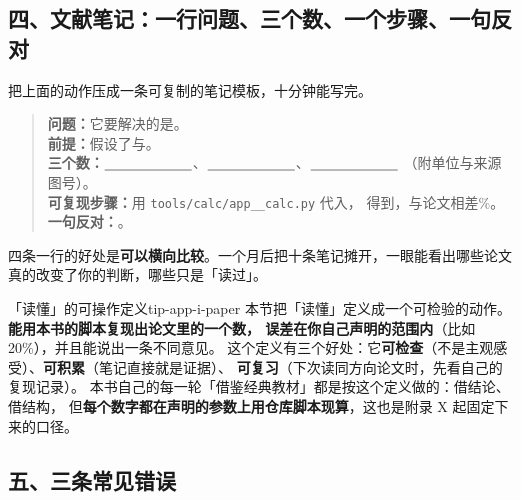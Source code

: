 \subsection*{四、文献笔记：一行问题、三个数、一个步骤、一句反对}

把上面的动作压成一条可复制的笔记模板，十分钟能写完。

\begin{quote}
\textbf{问题：}它要解决的是\underline{\hspace{3cm}}。\\
\textbf{前提：}假设了\underline{\hspace{1.6cm}}与\underline{\hspace{1.6cm}}。\\
\textbf{三个数：}$\underline{\hspace{2.2cm}}$、$\underline{\hspace{2.2cm}}$、$\underline{\hspace{2.2cm}}$
（附单位与来源图号）。\\
\textbf{可复现步骤：}用 \texttt{tools/\allowbreak{}calc/\allowbreak{}app\_\_calc.py} 代入\underline{\hspace{2.6cm}}，
得到\underline{\hspace{2.0cm}}，与论文相差\underline{\hspace{1.2cm}}\%。\\
\textbf{一句反对：}\underline{\hspace{6cm}}。
\end{quote}

四条一行的好处是\textbf{可以横向比较}。一个月后把十条笔记摊开，一眼能看出哪些论文
真的改变了你的判断，哪些只是「读过」。

\begin{tip}{「读懂」的可操作定义}{tip-app-i-paper}
本节把「读懂」定义成一个可检验的动作。\textbf{能用本书的脚本复现出论文里的一个数，
误差在你自己声明的范围内}（比如 20\%），并且能说出一条不同意见。
这个定义有三个好处：它\textbf{可检查}（不是主观感受）、\textbf{可积累}（笔记直接就是证据）、
\textbf{可复习}（下次读同方向论文时，先看自己的复现记录）。
本书自己的每一轮「借鉴经典教材」都是按这个定义做的：借结论、借结构，
但\textbf{每个数字都在声明的参数上用仓库脚本现算}，这也是附录 X 起固定下来的口径。
\end{tip}

\subsection*{五、三条常见错误}

